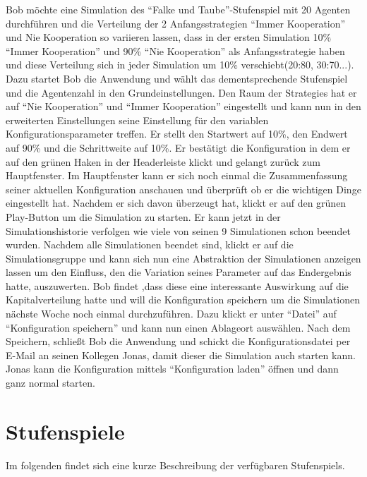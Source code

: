 \documentclass[parskip=full,11pt]{scrartcl}
\begin{document}
Bob möchte eine Simulation des \enquote{Falke und Taube}-\Gls{Stufenspiel} mit 20 Agenten durchführen und die Verteilung der 2 Anfangsstrategien \enquote{Immer Kooperation} und Nie Kooperation so variieren lassen, dass in der ersten Simulation 10\% \enquote{Immer Kooperation} und 90\% \enquote{Nie Kooperation} als Anfangsstrategie haben und diese Verteilung sich in jeder Simulation um 10\% verschiebt(20:80, 30:70...). Dazu startet Bob die Anwendung und wählt das dementsprechende \Gls{Stufenspiel} und die Agentenzahl in den Grundeinstellungen. Den Raum der \Glspl{Strategie} hat er auf \enquote{Nie Kooperation} und \enquote{Immer Kooperation} eingestellt und kann nun in den erweiterten Einstellungen seine Einstellung für den variablen Konfigurationsparameter treffen. Er stellt den Startwert auf 10\%, den Endwert auf 90\% und die Schrittweite auf 10\%. Er bestätigt die \Gls{Konfiguration} in dem er auf den grünen Haken in der Headerleiste klickt und gelangt zurück zum Hauptfenster. Im Hauptfenster kann er sich noch einmal die Zusammenfassung seiner aktuellen \Gls{Konfiguration} anschauen und überprüft ob er die wichtigen Dinge eingestellt hat. Nachdem er sich davon überzeugt hat, klickt er auf den grünen Play-Button um die Simulation zu starten. Er kann jetzt in der Simulationshistorie verfolgen wie viele von seinen 9 Simulationen schon beendet wurden. Nachdem alle Simulationen beendet sind, klickt er auf die Simulationsgruppe und kann sich nun eine Abstraktion der Simulationen anzeigen lassen um den Einfluss, den die Variation seines Parameter auf das Endergebnis hatte, auszuwerten. Bob findet ,dass diese eine interessante Auswirkung auf die Kapitalverteilung hatte und will die \Gls{Konfiguration} speichern um die Simulationen nächste Woche noch einmal durchzuführen. Dazu klickt er unter \enquote{Datei} auf \enquote{\Gls{Konfiguration} speichern} und kann nun einen Ablageort auswählen. Nach dem Speichern, schließt Bob die Anwendung und schickt die Konfigurationsdatei per E-Mail an seinen Kollegen Jonas, damit dieser die Simulation auch starten kann. Jonas kann die \Gls{Konfiguration} mittels \enquote{\Gls{Konfiguration} laden} öffnen und dann ganz normal starten.

\newpage

\section{Stufenspiele}
Im folgenden findet sich eine kurze Beschreibung der verfügbaren \Glspl{Stufenspiel}.
\end{document}
